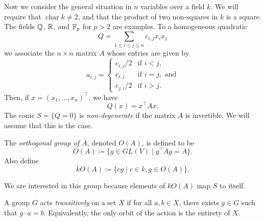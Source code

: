 Now we consider the general situation in $n$ variables over a field $k$. We will require that $\operatorname{char} k \neq 2$, and that the product of two non-squares in $k$ is a square. The fields $\mathbb{Q}$, $\mathbb{R}$, and $\mathbb{F}_p$ for $p>2$ are examples. To a homogeneous quadratic
\[
	Q = \sum_{1 \leq i \leq j \leq n} c_{i,j} x_i x_j 
\]
we associate the $n\times n$ matrix $A$ whose entries are given by
\[
	a_{i,j} = \begin{cases}
		{c_{i,j}}/{2} & \text{if } i < j,\\
		c_{i,j} & \text{if } i = j, \text{ and}\\
		{c_{j,i}}/{2} & \text{if } i > j.
	\end{cases}
\]
Then, if $x = (x_1,\ldots,x_n)^\top$, we have
\[
	Q(x) = x^\top A x.
\]
The conic $S = \{Q = 0\}$ is \emph{non-degenerate} if the matrix $A$ is invertible. We will assume that this is the case.

\begin{defn}
	The \emph{orthogonal group of $A$}, denoted $O(A)$, is defined to be
	\[
		O(A) \coloneqq \{ g \in GL(V) \mid g^\top A g = A\}.
	\]
	Also define
	\[
		kO(A) \coloneqq \{ cg \mid c\in k, g\in O(A)\}.
	\]
\end{defn}

We are interested in this group because elements of $kO(A)$ map $S$ to itself.
\begin{defn}
	A group $G$ acts \emph{transitively} on a set $X$ if for all $a,b\in X$, there exists $g\in G$ such that $g\cdot a = b$. Equivalently, the only orbit of the action is the entirety of $X$.
\end{defn}

